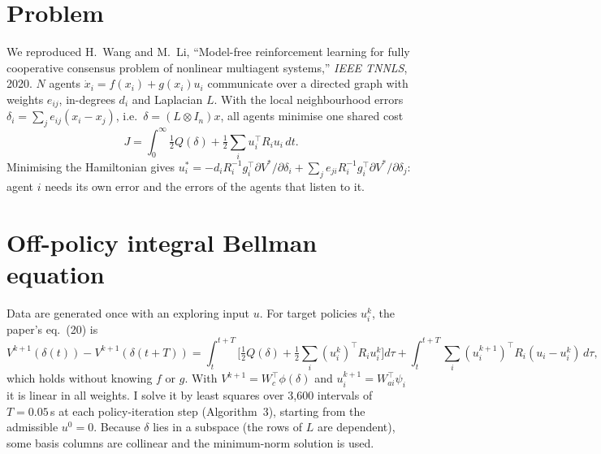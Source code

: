 


\section*{Problem}
We reproduced H.~Wang and M.~Li, ``Model-free reinforcement learning for fully cooperative consensus problem of nonlinear multiagent systems,'' \emph{IEEE TNNLS}, 2020. $N$ agents $\dot x_i=f(x_i)+g(x_i)u_i$ communicate over a directed graph with weights $e_{ij}$, in-degrees $d_i$ and Laplacian $L$. With the local neighbourhood errors $\delta_i=\sum_j e_{ij}(x_i-x_j)$, i.e.\ $\delta=(L\otimes I_n)x$, all agents minimise one shared cost
\[
J=\int_0^\infty \tfrac12 Q(\delta)+\tfrac12\textstyle\sum_i u_i^\top R_iu_i\,dt .
\]
Minimising the Hamiltonian gives $u_i^*=-d_iR_i^{-1}g_i^\top\partial V^*/\partial\delta_i+\sum_j e_{ji}R_i^{-1}g_i^\top\partial V^*/\partial\delta_j$: agent $i$ needs its own error and the errors of the agents that listen to it.

\section*{Off-policy integral Bellman equation}
Data are generated once with an exploring input $u$. For target policies $u_i^k$, the paper's eq.~(20) is
\[
V^{k+1}(\delta(t))-V^{k+1}(\delta(t{+}T))=\int_t^{t+T}\!\Big[\tfrac12Q(\delta)+\tfrac12\sum_i (u_i^k)^\top R_iu_i^k\Big]d\tau+\int_t^{t+T}\sum_i(u_i^{k+1})^\top R_i(u_i-u_i^k)\,d\tau,
\]
which holds without knowing $f$ or $g$. With $V^{k+1}=W_c^\top\phi(\delta)$ and $u_i^{k+1}=W_{ai}^\top\psi_i$ it is linear in all weights. I solve it by least squares over 3{,}600 intervals of $T=0.05$\,s at each policy-iteration step (Algorithm~3), starting from the admissible $u^0=0$. Because $\delta$ lies in a subspace (the rows of $L$ are dependent), some basis columns are collinear and the minimum-norm solution is used.

